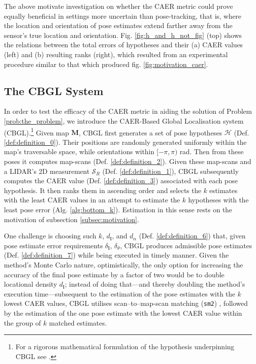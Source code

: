 The above motivate investigation on whether the CAER metric could prove equally
beneficial in settings more uncertain than pose-tracking, that is, where the
location and orientation of pose estimates extend farther away from the
sensor's true location and orientation. Fig. \ref{fig:h_and_h_not_fig} (top)
shows the relations between the total errors of hypotheses and
their (a) CAER values (left) and (b) resulting ranks (right),
which resulted from an experimental procedure similar to that which produced fig.
\ref{fig:motivation_caer}.

\subsection{The CBGL System}

In order to test the efficacy of the CAER metric in aiding the solution of
Problem \ref{prob:the_problem}, we introduce the CAER-Based Global Localisation
system (CBGL).\footnote{For a rigorous mathematical formulation of the
hypothesis underpinning CBGL see \cite{cbglarxiv}.} Given map $\bm{M}$, CBGL
first generates a set of pose hypotheses $\mathcal{H}$ (Def.
\ref{def:definition_0}). Their positions are randomly generated
uniformly within the map's traversable space, while orientations within
$[-\pi,\pi)$ rad. Then from these poses it computes map-scans (Def.
\ref{def:definition_2}). Given these map-scans and a LIDAR's 2D measurement
$\mathcal{S}_R$ (Def. \ref{def:definition_1}), CBGL subsequently computes the
CAER value (Def. \ref{def:definition_3}) associated with each pose hypothesis.
It then ranks them in ascending order and selects the $k$ estimates with the
least CAER values in an attempt to estimate the $k$ hypotheses with the least
pose error (Alg. \ref{alg:bottom_k}). Estimation in this sense rests on the
motivation of subsection \ref{subsec:motivation}.

One challenge is choosing such $k$, $d_{\bm{l}}$, and $d_\alpha$ (Def.
\ref{def:definition_6}) that, given pose estimate error requirements
$\delta_{\bm{l}}$, $\delta_{\theta}$, CBGL produces admissible pose estimates
(Def. \ref{def:definition_7}) while being executed in timely manner.  Given the
method's Monte Carlo nature, optimistically, the only option for increasing
the accuracy of the final pose estimate by a factor of two would be to double
locational density $d_{\bm{l}}$; instead of doing that---and thereby
doubling the method's execution time---subsequent to the estimation of the pose
estimates with the $k$ lowest CAER values, CBGL utilises scan--to--map-scan
matching (\texttt{sm2}) \cite{Vasiljevic2016c,Filotheou2023a}, followed by the
estimation of the one pose estimate with the lowest CAER value within the group
of $k$ matched estimates.


